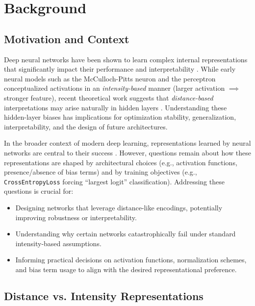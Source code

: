 \documentclass{article}
\begin{document}
\section{Background}

\subsection{Motivation and Context}
Deep neural networks have been shown to learn complex internal representations that significantly impact their performance and interpretability \cite{goodfellow2016deep, lipton2018mythos}. While early neural models such as the McCulloch-Pitts neuron \cite{mcculloch1943logical} and the perceptron \cite{rosenblatt1958perceptron} conceptualized activations in an \emph{intensity-based} manner (larger activation $\implies$ stronger feature), recent theoretical work suggests that \emph{distance-based} interpretations may arise naturally in hidden layers \cite{oursland2024}. Understanding these hidden-layer biases has implications for optimization stability, generalization, interpretability, and the design of future architectures.

In the broader context of modern deep learning, representations learned by neural networks are central to their success \cite{schmidhuber2015deep}. However, questions remain about how these representations are shaped by architectural choices (e.g., activation functions, presence/absence of bias terms) and by training objectives (e.g., \texttt{CrossEntropyLoss} forcing “largest logit” classification). Addressing these questions is crucial for:
\begin{itemize}
    \item Designing networks that leverage distance-like encodings, potentially improving robustness or interpretability.
    \item Understanding why certain networks catastrophically fail under standard intensity-based assumptions.
    \item Informing practical decisions on activation functions, normalization schemes, and bias term usage to align with the desired representational preference.
\end{itemize}

\subsection{Distance vs. Intensity Representations}
\end{document}
